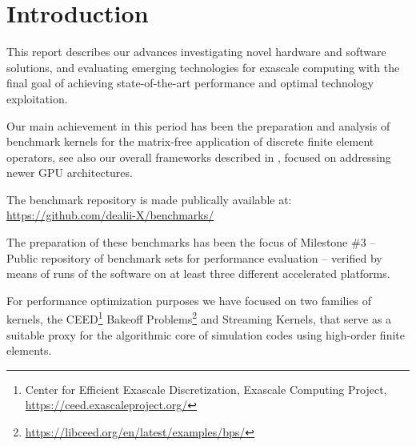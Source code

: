 \documentclass[a4paper,12pt]{article}
\newcommand{\mycomment}[1]{}
\begin{document}
\vspace*{2cm}

\disclaimer

\newpage

\tableofcontents %

\newpage

\section{{Introduction}}

\mycomment{
    \begin{itemize}
        \item Investigate novel hardware and software solutions to leverage the latest advancements in high-performance computing
    to achieve optimal performance
        \item Identify and evaluate emerging technologies that can be exploited to enhance the capabilities of the exascale computing
    system.
        \item Explore and implement techniques to optimize energy consumption and power efficiency in the exascale computing
    infrastructure.
        \item Identify and address bottlenecks in the system to improve overall computational efficiency.
    \end{itemize}
}

This report describes our advances investigating novel hardware and software solutions, and evaluating emerging technologies for exascale computing with the final goal of achieving state-of-the-art performance and optimal technology exploitation.

Our main achievement in this period has been the preparation and analysis of benchmark kernels for the matrix-free application of discrete finite element operators, see also our overall frameworks described in \cite{Kronbichler12,Kronbichler19}, focused on addressing newer GPU architectures. 

The benchmark repository is made publically available at: \url{https://github.com/dealii-X/benchmarks/}

The preparation of these benchmarks has been the focus of Milestone \#3 -- Public repository of benchmark sets for performance evaluation -- verified by means of runs of the software on at
least three different accelerated platforms.

For performance optimization purposes we have focused on two families of kernels, the CEED\footnote{Center for Efficient Exascale Discretization, Exascale Computing Project, \url{https://ceed.exascaleproject.org/}} Bakeoff Problems\footnote{\url{https://libceed.org/en/latest/examples/bps/}} and Streaming Kernels, that serve as a suitable proxy for the algorithmic core of simulation codes using high-order finite elements.
\end{document}
